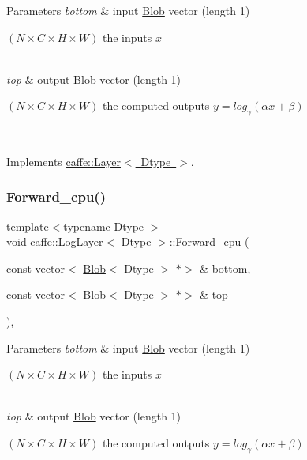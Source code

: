 \begin{DoxyParams}{Parameters}
{\em bottom} & input \mbox{\hyperlink{classcaffe_1_1_blob}{Blob}} vector (length 1)
\begin{DoxyEnumerate}
\item $ (N \times C \times H \times W) $ the inputs $ x $ 
\end{DoxyEnumerate}\\
\hline
{\em top} & output \mbox{\hyperlink{classcaffe_1_1_blob}{Blob}} vector (length 1)
\begin{DoxyEnumerate}
\item $ (N \times C \times H \times W) $ the computed outputs $ y = log_{\gamma}(\alpha x + \beta) $ 
\end{DoxyEnumerate}\\
\hline
\end{DoxyParams}


Implements \mbox{\hyperlink{classcaffe_1_1_layer_a576ac6a60b1e99fe383831f52a6cea77}{caffe\+::\+Layer$<$ Dtype $>$}}.

\mbox{\label{classcaffe_1_1_log_layer_a407de9bdb364ed170a73c6eebc74dce9}} 
\subsubsection{\texorpdfstring{Forward\+\_\+cpu()}{Forward\_cpu()}\hspace{0.1cm}{\footnotesize\ttfamily [2/2]}}
{\footnotesize\ttfamily template$<$typename Dtype $>$ \\
void \mbox{\hyperlink{classcaffe_1_1_log_layer}{caffe\+::\+Log\+Layer}}$<$ Dtype $>$\+::Forward\+\_\+cpu (\begin{DoxyParamCaption}\item[{const vector$<$ \mbox{\hyperlink{classcaffe_1_1_blob}{Blob}}$<$ Dtype $>$ $\ast$$>$ \&}]{bottom,  }\item[{const vector$<$ \mbox{\hyperlink{classcaffe_1_1_blob}{Blob}}$<$ Dtype $>$ $\ast$$>$ \&}]{top }\end{DoxyParamCaption})\hspace{0.3cm}{\ttfamily [protected]}, {\ttfamily [virtual]}}


\begin{DoxyParams}{Parameters}
{\em bottom} & input \mbox{\hyperlink{classcaffe_1_1_blob}{Blob}} vector (length 1)
\begin{DoxyEnumerate}
\item $ (N \times C \times H \times W) $ the inputs $ x $ 
\end{DoxyEnumerate}\\
\hline
{\em top} & output \mbox{\hyperlink{classcaffe_1_1_blob}{Blob}} vector (length 1)
\begin{DoxyEnumerate}
\item $ (N \times C \times H \times W) $ the computed outputs $ y = log_{\gamma}(\alpha x + \beta) $ 
\end{DoxyEnumerate}\\
\hline
\end{DoxyParams}


